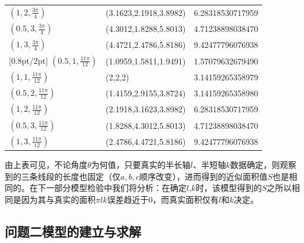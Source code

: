 \documentclass[a4paper,10.5pt]{ctexart}
\begin{document}
\begin{table}[h]
\begin{tabular}{C{4cm}C{5cm}C{4.5cm}}
$(1,2,\frac{3\pi}{4})$     & (3.1623,2.1918,3.8982)   &   6.28318530717959 \\
$(0.5,3,\frac{3\pi}{4})$   &(4.3012,1.8288,5.8013)  &   4.71238898038470 \\
$(1,3,\frac{3\pi}{4})$     & (4.4721,2.4786,5.8186)   &  9.42477796076938 \\[0.8pt/2pt]
$(0.5,1,\frac{11\pi}{12})$ &(1.0959,1.5811,1.9491) &  1.57079632679490  \\
$(1,1,\frac{11\pi}{12})$   &   (2,2,2)   & 3.14159265358979 \\
$(0.5,2,\frac{11\pi}{12})$ & (1.4159,2.9155,3.8724)& 3.14159265358980 \\
$(1,2,\frac{11\pi}{12})$   &(2.1918,3.1623,3.8982) & 6.28318530717959 \\
$(0.5,3,\frac{11\pi}{12})$ & (1.8288,4.3012,5.8013) &  4.71238898038470 \\
$(1,3,\frac{11\pi}{12})$   &  (2.4786,4.4721,5.8186)   &  9.42477796076938 \\
\bottomrule[2pt]
\end{tabular}
\label{tab:wei1}
\end{table}

\par 由上表可见，不论角度$\theta$为何值，只要真实的半长轴$l$、半短轴$k$数据确定，则观察到的三条线段的长度也固定（仅$a,b,c$顺序改变），进而得到的近似面积值$S$也是相同的。在下一部分模型检验中我们将分析：在确定$l$,$k$时，该模型得到的$S$之所以相同是因为其与真实的面积$\pi lk$误差趋近于0，而真实面积仅有$l$和$k$决定。
\subsection{问题二模型的建立与求解}
\end{document}
